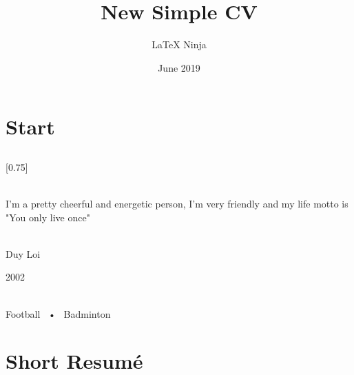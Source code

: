 \documentclass[lighthipster]{simplehipstercv}
\title{New Simple CV}
\author{\LaTeX{} Ninja}
\date{June 2019}
\begin{document}
\thispagestyle{empty}

\section*{Start}





\subsection*{}
\vspace{4em}

\setlength{\columnsep}{1.5cm}
[0.75]
\begin{paracol}{2}


\paracolbackgroundoptions



\footnotesize
{\setasidefontcolour
\flushright
\begin{center}
\end{center}

\\[0.5em]

{\footnotesize
I'm a pretty cheerful and energetic person, I'm very friendly and my life motto is "You only live once"}
\bigskip

 \\[0.5em]
Duy Loi

2002

\bigskip

 \\[0.5em]

Football ~•~ Badminton 

\bigskip



\bigskip


\bigskip



\vspace{4em}


\phantom{turn the page}

\phantom{turn the page}
}
\switchcolumn

\small
\section*{Short Resumé}


\end{paracol}
\end{document}
